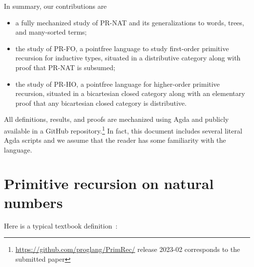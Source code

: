 \documentclass[a4paper,USenglish,cleveref, autoref, thm-restate]{lipics-v2021}
\begin{document}
In summary, our contributions are
\begin{itemize}
\item a fully mechanized study of PR-NAT and its generalizations to
  words, trees, and many-sorted terms;
\item the study of PR-FO, a pointfree language to study first-order primitive
  recursion for inductive types, situated in a distributive category
  along with proof that PR-NAT is subsumed;
\item the study of PR-HO, a pointfree language for higher-order
  primitive recursion, situated in a bicartesian closed category along
  with an elementary proof that any bicartesian closed category is
  distributive. 
\end{itemize}

All definitions, results, and proofs are mechanized using Agda \cite{DBLP:conf/afp/Norell08} and
publicly available in a GitHub
repository.\footnote{\url{https://github.com/proglang/PrimRec/}
  release 2023-02 corresponds to the submitted paper} In fact, this
document includes several literal Agda scripts and we assume that the
reader has some familiarity with the language.

\section{Primitive recursion on natural numbers}
\label{sec:prim-recurs-natur}


Here is a typical textbook definition~\cite{martin2019logik,wiki:Primitive_recursive_function}:
\end{document}

